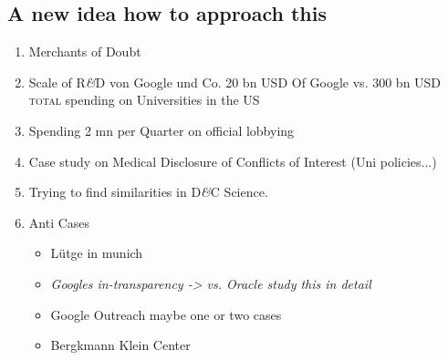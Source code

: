 \subsection{A new idea how to approach this}
\begin{enumerate}
    \item Merchants of Doubt
    \item Scale of R\textit{\&}D von Google und Co. 20 bn USD Of Google vs. 300 bn USD \textsc{total} spending on Universities in the US \citep{sah_conflict_2018}
    \item Spending 2 mn per Quarter on official lobbying
    \item Case study on Medical Disclosure of Conflicts of Interest (Uni policies...)
    \item Trying to find similarities in D\textit{\&}C Science. 
    \item Anti Cases \begin{itemize}
        \item Lütge in munich
        \item \textit{Googles in-transparency -> vs. Oracle study this in detail}
        \item Google Outreach maybe one or two cases
        \item Bergkmann Klein Center 
    \end{itemize}
\end{enumerate}